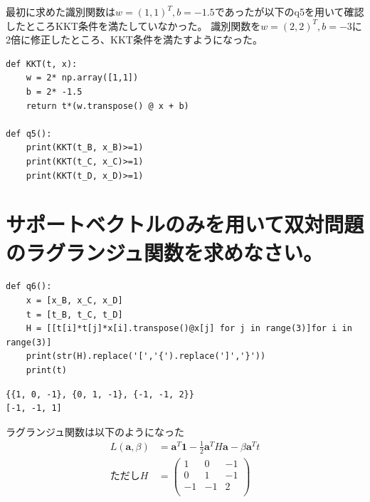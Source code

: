 \documentclass{ltjsarticle}
\begin{document}
最初に求めた識別関数は$w = (1,1)^T, b = -1.5$であったが以下のq5を用いて確認したところKKT条件を満たしていなかった。
識別関数を$w = (2,2)^T, b = -3$に2倍に修正したところ、KKT条件を満たすようになった。

\begin{lstlisting}
def KKT(t, x):
    w = 2* np.array([1,1])
    b = 2* -1.5
    return t*(w.transpose() @ x + b)

def q5():
    print(KKT(t_B, x_B)>=1)
    print(KKT(t_C, x_C)>=1)
    print(KKT(t_D, x_D)>=1)
\end{lstlisting}


\section{サポートベクトルのみを用いて双対問題のラグランジュ関数を求めなさい。}

\begin{lstlisting}[caption=Hを求め、Mathematicaの形式に変換するPythonプログラム]
def q6():
    x = [x_B, x_C, x_D]
    t = [t_B, t_C, t_D]
    H = [[t[i]*t[j]*x[i].transpose()@x[j] for j in range(3)]for i in range(3)]
    print(str(H).replace('[','{').replace(']','}'))
    print(t)
\end{lstlisting}
\begin{lstlisting}[caption=output]
{{1, 0, -1}, {0, 1, -1}, {-1, -1, 2}}
[-1, -1, 1]
\end{lstlisting}


ラグランジュ関数は以下のようになった
\begin{align}
	L(\bm{a},\beta) &= \bm{a}^T\bm{1} - \frac{1}{2} \bm{a}^T H\bm{a} - \beta\bm{a}^T t \\
	ただしH &=
	\begin{pmatrix}
		1  & 0  & -1\\
		0  & 1  & -1\\
		-1 & -1 & 2 \\
	\end{pmatrix}
\end{align}
\end{document}
